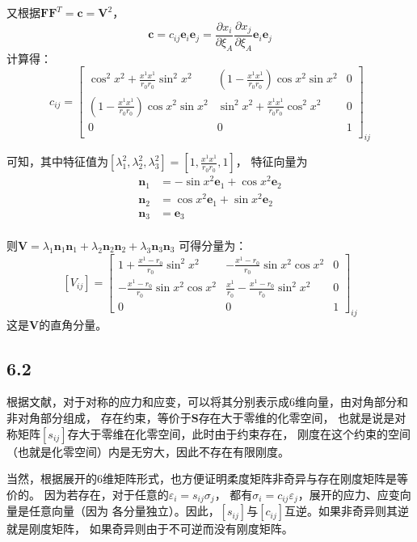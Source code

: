 \documentclass[UTF8,zihao=5]{ctexart}
\newcommand{\bm}[1]{{\mathbf{#1}}}
\newcommand*{\pd}[2]{\frac{\partial #1}{\partial #2}}
\begin{document}
又根据$\bm{F}\bm{F}^{T}=\bm{c}=\bm{V}^2$，
$$
    \bm{c}=c_{ij}\bm{e}_i\bm{e}_j=\pd{x_i}{\xi_A}\pd{x_j}{\xi_A}\bm{e}_i\bm{e}_j
$$
计算得：
$$
    c_{ij}=\begin{bmatrix}
        \cos^2{x^2} + \frac{x^1x^1}{r_0r_0}\sin^2{x^2}         &
        \left(1-\frac{x^1x^1}{r_0r_0}\right)\cos{x^2}\sin{x^2} & 0     \\
        \left(1-\frac{x^1x^1}{r_0r_0}\right)\cos{x^2}\sin{x^2} &
        \sin^2{x^2} + \frac{x^1x^1}{r_0r_0}\cos^2{x^2}         & 0     \\
        0                                                      & 0 & 1 \\
    \end{bmatrix}_{ij}
$$

可知，其中特征值为$[\lambda_1^2,\lambda_2^2,\lambda_3^2]=[1,\frac{x^1x^1}{r_0r_0},1]$，
特征向量为
$$
    \begin{aligned}
        \bm{n}_1 & =-\sin{x^2}\bm{e}_1 + \cos{x^2}\bm{e}_2 \\
        \bm{n}_2 & = \cos{x^2}\bm{e}_1 + \sin{x^2}\bm{e}_2 \\
        \bm{n}_3 & = \bm{e}_3                              \\
    \end{aligned}
$$

则$\bm{V}=\lambda_1\bm{n}_1\bm{n}_1 + \lambda_2\bm{n}_2\bm{n}_2 + \lambda_3\bm{n}_3\bm{n}_3$
可得分量为：
$$
    [V_{ij}]=\begin{bmatrix}
        1 + \frac{x^1-r_0}{r_0}\sin^2{x^2}               &
        -\frac{x^1-r_0}{r_0}\sin{x^2}\cos{x^2}           & 0     \\
        -\frac{x^1-r_0}{r_0}\sin{x^2}\cos{x^2}           &
        \frac{x^1}{r_0} - \frac{x^1-r_0}{r_0}\sin^2{x^2} & 0     \\
        0                                                & 0 & 1
    \end{bmatrix}_{ij}
$$
这是$\bm{V}$的直角分量。

\subsection*{6.2}
根据文献，对于对称的应力和应变，可以将其分别表示成6维向量，由对角部分和非对角部分组成，
存在约束，等价于$\bm{S}$存在大于零维的化零空间，
也就是说是对称矩阵$[s_{ij}]$存大于零维在化零空间，此时由于约束存在，
刚度在这个约束的空间（也就是化零空间）内是无穷大，因此不存在有限刚度。

当然，根据展开的6维矩阵形式，也方便证明柔度矩阵非奇异与存在刚度矩阵是等价的。
因为若存在，对于任意的$\varepsilon_i=s_{ij}\sigma_j$，
都有$\sigma_i=c_{ij}\varepsilon_j$，展开的应力、应变向量是任意向量（因为
各分量独立）。因此，$[s_{ij}]$与$[c_{ij}]$互逆。如果非奇异则其逆就是刚度矩阵，
如果奇异则由于不可逆而没有刚度矩阵。
\end{document}
